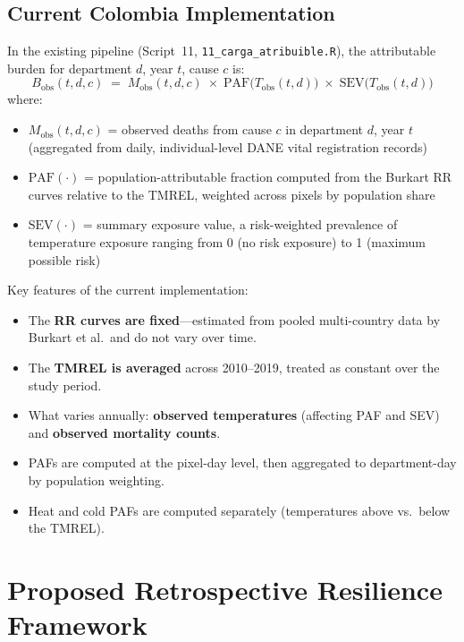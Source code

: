\documentclass[11pt,a4paper]{article}
\begin{document}
\subsection{Current Colombia Implementation}

In the existing pipeline (Script~11, \texttt{11\_carga\_atribuible.R}), the attributable burden for department $d$, year $t$, cause $c$ is:
\begin{equation}
  B_{\text{obs}}(t,d,c) \;=\; M_{\text{obs}}(t,d,c) \;\times\; \text{PAF}\bigl(T_{\text{obs}}(t,d)\bigr) \;\times\; \text{SEV}\bigl(T_{\text{obs}}(t,d)\bigr)
  \label{eq:current}
\end{equation}
where:
\begin{itemize}[nosep]
  \item $M_{\text{obs}}(t,d,c)$ = observed deaths from cause $c$ in department $d$, year $t$ (aggregated from daily, individual-level DANE vital registration records)
  \item $\text{PAF}(\cdot)$ = population-attributable fraction computed from the Burkart RR curves relative to the TMREL, weighted across pixels by population share
  \item $\text{SEV}(\cdot)$ = summary exposure value, a risk-weighted prevalence of temperature exposure ranging from 0 (no risk exposure) to 1 (maximum possible risk)
\end{itemize}

Key features of the current implementation:
\begin{itemize}[nosep]
  \item The \textbf{RR curves are fixed}---estimated from pooled multi-country data by Burkart et al.\ and do not vary over time.
  \item The \textbf{TMREL is averaged} across 2010--2019, treated as constant over the study period.
  \item What varies annually: \textbf{observed temperatures} (affecting PAF and SEV) and \textbf{observed mortality counts}.
  \item PAFs are computed at the pixel-day level, then aggregated to department-day by population weighting.
  \item Heat and cold PAFs are computed separately (temperatures above vs.\ below the TMREL).
\end{itemize}

\section{Proposed Retrospective Resilience Framework}
\end{document}
